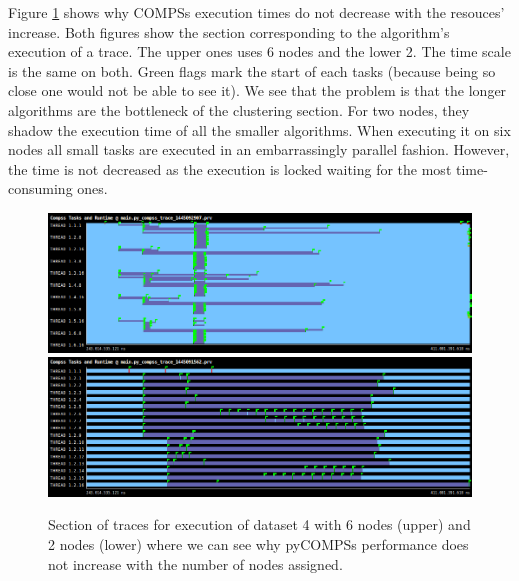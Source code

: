 Figure \ref{fig:scalability} shows why COMPSs execution times do not decrease with the resouces' increase. Both figures show the section corresponding to the algorithm's execution of a trace. The upper ones uses 6 nodes and the lower 2. The time scale is the same on both. Green flags mark the start of each tasks (because being so close one would not be able to see it). We see that the problem is that the longer algorithms are the bottleneck of the clustering section. For two nodes, they shadow the execution time of all the smaller algorithms. When executing it on six nodes all small tasks are executed in an embarrassingly parallel fashion. However, the time is not decreased as the execution is locked waiting for the most time-consuming ones.

\begin{figure}[h]
\includegraphics[width=\textwidth]{traces/compss_6_piece_tasks.png}
\includegraphics[width=\textwidth]{traces/compss_2_piece_tasks.png}
\caption{Section of traces for execution of dataset 4 with 6 nodes (upper) and 2 nodes (lower) where we can see why pyCOMPSs performance does not increase with the number of nodes assigned.}
\label{fig:scalability}
\end{figure}




 